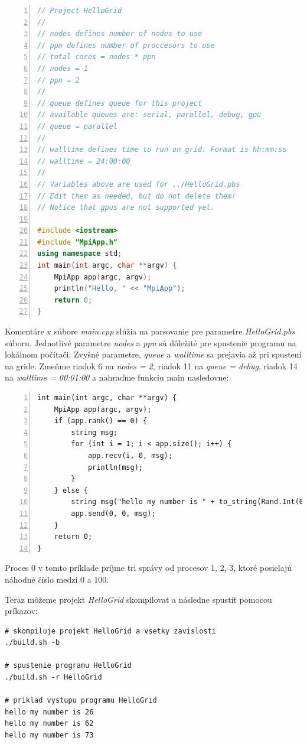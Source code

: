 \begin{lstlisting}[language=c++, caption={HelloGrid/src/main.cpp}, numbers=left]
// Project HelloGrid
//
// nodes defines number of nodes to use
// ppn defines number of proccesors to use
// total cores = nodes * ppn
// nodes = 1
// ppn = 2
//
// queue defines queue for this project
// available queues are: serial, parallel, debug, gpu
// queue = parallel
//
// walltime defines time to run on grid. Format is hh:mm:ss
// walltime = 24:00:00
//
// Variables above are used for ../HelloGrid.pbs
// Edit them as needed, but do not delete them!
// Notice that gpus are not supported yet.

#include <iostream>
#include "MpiApp.h"
using namespace std;
int main(int argc, char **argv) {
    MpiApp app(argc, argv);
    println("Hello, " << "MpiApp");
    return 0;
}
\end{lstlisting}
Komentáre v súbore \textit{main.cpp} slúžia na parsovanie pre parametre \textit{HelloGrid.pbs} súboru.
Jednotlivé parametre \textit{nodes} a \textit{ppn} sú dôležité pre spustenie programu na lokálnom počítači. Zvyšné parametre, \textit{queue} a \textit{walltime} sa prejavia až pri spustení na gride.
Zmeňme riadok 6 na \textit{nodes = 2}, riadok 11 na \textit{queue = debug}, riadok 14 na \textit{walltime = 00:01:00}
a nahraďme funkciu main nasledovne:
\begin{lstlisting}[numbers=left]
int main(int argc, char **argv) {
    MpiApp app(argc, argv);
    if (app.rank() == 0) {
        string msg;
        for (int i = 1; i < app.size(); i++) {
            app.recv(i, 0, msg);
            println(msg);
        }
    } else {
        string msg("hello my number is " + to_string(Rand.Int(0, 100)));
        app.send(0, 0, msg);
    }
    return 0;
}  
\end{lstlisting}
Proces 0 v tomto príklade príjme tri správy od procesov 1, 2, 3, ktoré posielajú náhodné číslo medzi 0 a 100.

Teraz môžeme projekt \textit{HelloGrid} skompilovať a následne spustiť pomocou príkazov:
\begin{lstlisting}
# skompiluje projekt HelloGrid a vsetky zavislosti
./build.sh -b

# spustenie programu HelloGrid
./build.sh -r HelloGrid

# priklad vystupu programu HelloGrid
hello my number is 26
hello my number is 62
hello my number is 73
\end{lstlisting}

